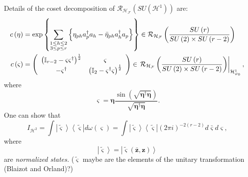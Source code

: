 \documentclass[aps,preprint]{revtex4}%
\begin{document}
Details of the coset decomposition of $\mathcal{R}_{\mathcal{H}_{\mathcal{F}}%
}\left(  SU\left(  \mathcal{H}^{1}\right)  \right)  $ are:
\begin{align}
c\left(  \mathbf{\eta}\right)   &  =\exp\left\{  \sum\limits_{\substack{1\leq
h\leq2\\3\leq p\leq r}}\left\{  \eta_{ph}a_{p}^{\dagger}a_{h}-\bar{\eta}%
_{ph}a_{h}^{\dagger}a_{p}\right\}  \right\}  \in\mathcal{R}_{\mathcal{H}%
_{\mathcal{F}}}\left(  \frac{SU\left(  r\right)  }{SU\left(  2\right)  \times
SU\left(  r-2\right)  }\right)  \nonumber\\
c\left(  \mathbf{\varsigma}\right)   &  =\left(
\begin{array}
[c]{cc}%
\left(  \mathbb{I}_{r-2}-\mathbf{\varsigma\varsigma}^{\dagger}\right)
^{\frac{1}{2}} & \mathbf{\varsigma}\\
-\mathbf{\varsigma}^{\dagger} & \left(  \mathbb{I}_{2}-\mathbf{\varsigma
}^{\dagger}\mathbf{\varsigma}\right)  ^{\frac{1}{2}}%
\end{array}
\right)  \in\left.  \mathcal{R}_{\mathcal{H}_{\mathcal{F}}}\left(
\frac{SU\left(  r\right)  }{SU\left(  2\right)  \times SU\left(  r-2\right)
}\right)  \right\vert _{\mathcal{H}_{\mathbf{\varphi}_{0}}^{1}},
\end{align}
where%
\begin{equation}
\mathbf{\varsigma}=\mathbf{\eta}\frac{\sin\left(  \sqrt{\mathbf{\eta}%
^{\dagger}\mathbf{\eta}}\right)  }{\sqrt{\mathbf{\eta}^{\dagger}\mathbf{\eta}%
}}.
\end{equation}
One can show that
\begin{equation}
I_{\mathcal{H}^{2}}=\int\left\vert \mathbf{\tilde{\varsigma}}\right\rangle
\left\langle \mathbf{\tilde{\varsigma}}\right\vert d\omega\left(
\mathbf{\varsigma}\right)  =\int\left\vert \mathbf{\tilde{\varsigma}%
}\right\rangle \left\langle \mathbf{\tilde{\varsigma}}\right\vert \left(  2\pi
i\right)  ^{-2\left(  r-2\right)  }d\mathbf{\bar{\varsigma}}d\mathbf{\varsigma
},
\end{equation}
where
\begin{equation}
\left\vert \mathbf{\tilde{\varsigma}}\right\rangle =\left\vert \mathbf{\tilde
{\varsigma}}\left(  \mathbf{\bar{z},z}\right)  \right\rangle
\end{equation}
are \emph{normalized states. }($\mathbf{\tilde{\varsigma}}$ maybe are the
elements of the unitary transformation (Blaizot and Orland)?)
\end{document}
